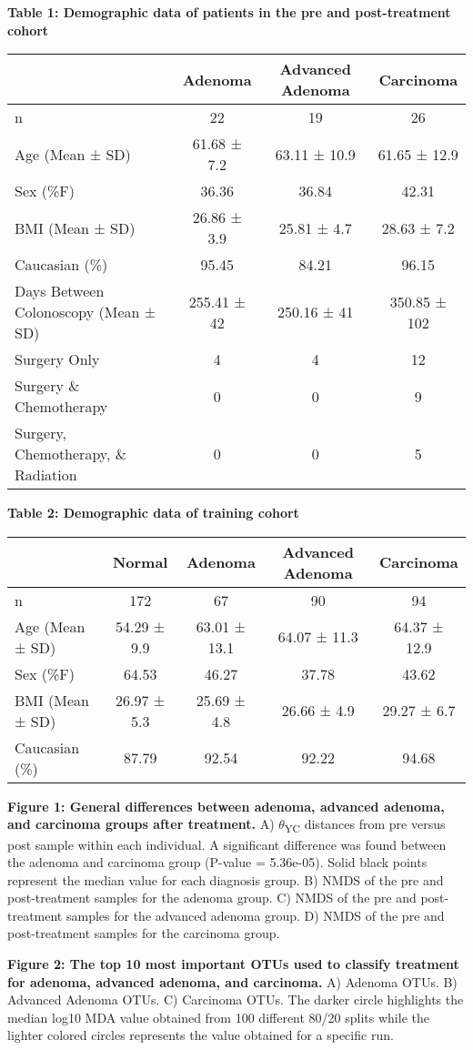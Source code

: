 \documentclass[12pt,]{article}
\begin{document}
\newpage

\textbf{Table 1: Demographic data of patients in the pre and
post-treatment cohort}

\begin{longtable}[]{@{}lccc@{}}
\toprule
& Adenoma & Advanced Adenoma & Carcinoma\tabularnewline
\midrule
\endhead
n & 22 & 19 & 26\tabularnewline
Age (Mean ± SD) & 61.68 ± 7.2 & 63.11 ± 10.9 & 61.65 ±
12.9\tabularnewline
Sex (\%F) & 36.36 & 36.84 & 42.31\tabularnewline
BMI (Mean ± SD) & 26.86 ± 3.9 & 25.81 ± 4.7 & 28.63 ± 7.2\tabularnewline
Caucasian (\%) & 95.45 & 84.21 & 96.15\tabularnewline
Days Between Colonoscopy (Mean ± SD) & 255.41 ± 42 & 250.16 ± 41 &
350.85 ± 102\tabularnewline
Surgery Only & 4 & 4 & 12\tabularnewline
Surgery \& Chemotherapy & 0 & 0 & 9\tabularnewline
Surgery, Chemotherapy, \& Radiation & 0 & 0 & 5\tabularnewline
\bottomrule
\end{longtable}

\newpage

\textbf{Table 2: Demographic data of training cohort}

\begin{longtable}[]{@{}lcccc@{}}
\toprule
& Normal & Adenoma & Advanced Adenoma & Carcinoma\tabularnewline
\midrule
\endhead
n & 172 & 67 & 90 & 94\tabularnewline
Age (Mean ± SD) & 54.29 ± 9.9 & 63.01 ± 13.1 & 64.07 ± 11.3 & 64.37 ±
12.9\tabularnewline
Sex (\%F) & 64.53 & 46.27 & 37.78 & 43.62\tabularnewline
BMI (Mean ± SD) & 26.97 ± 5.3 & 25.69 ± 4.8 & 26.66 ± 4.9 & 29.27 ±
6.7\tabularnewline
Caucasian (\%) & 87.79 & 92.54 & 92.22 & 94.68\tabularnewline
\bottomrule
\end{longtable}

\newpage

\textbf{Figure 1: General differences between adenoma, advanced adenoma,
and carcinoma groups after treatment.} A) \(\theta\)\textsubscript{YC}
distances from pre versus post sample within each individual. A
significant difference was found between the adenoma and carcinoma group
(P-value = 5.36e-05). Solid black points represent the median value for
each diagnosis group. B) NMDS of the pre and post-treatment samples for
the adenoma group. C) NMDS of the pre and post-treatment samples for the
advanced adenoma group. D) NMDS of the pre and post-treatment samples
for the carcinoma group.

\textbf{Figure 2: The top 10 most important OTUs used to classify
treatment for adenoma, advanced adenoma, and carcinoma.} A) Adenoma
OTUs. B) Advanced Adenoma OTUs. C) Carcinoma OTUs. The darker circle
highlights the median log10 MDA value obtained from 100 different 80/20
splits while the lighter colored circles represents the value obtained
for a specific run.
\end{document}
